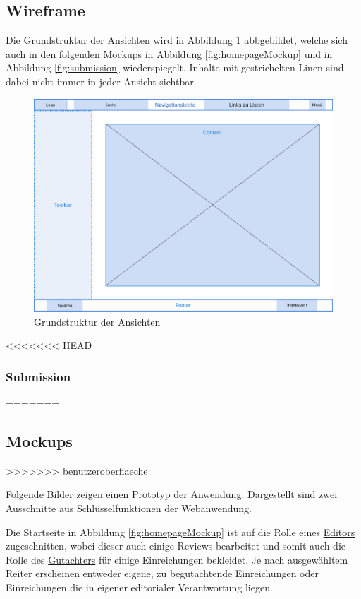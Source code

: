 \subsection{Wireframe}

Die Grundstruktur der Ansichten wird in Abbildung \ref{fig:wireframe} abbgebildet, welche sich auch in den folgenden Mockups in Abbildung \ref{fig:homepageMockup} und in Abbildung \ref{fig:submission} wiederspiegelt.
Inhalte mit gestrichelten Linen sind dabei nicht immer in jeder Ansicht sichtbar.

\begin{figure}[H]
	\centering
	\includegraphics[width=0.85\linewidth]{graphics/Wireframe}
	\caption{Grundstruktur der Ansichten}
	\label{fig:wireframe}
\end{figure}

<<<<<<< HEAD
\subsubsection{Submission}
=======
\subsection{Mockups}
>>>>>>> benutzeroberflaeche

Folgende Bilder zeigen einen Prototyp der Anwendung.
Dargestellt sind zwei Ausschnitte aus Schlüsselfunktionen der Webanwendung.

Die Startseite in Abbildung \ref{fig:homepageMockup} ist auf die Rolle eines \hyperref[glo:editor]{Editors} zugeschnitten, wobei dieser auch einige
Reviews bearbeitet und somit auch die Rolle des \hyperref[glo:gutachter]{Gutachters} für einige Einreichungen bekleidet.
Je nach ausgewähltem Reiter erscheinen entweder eigene, zu begutachtende Einreichungen oder Einreichungen die in eigener editorialer Verantwortung liegen.

